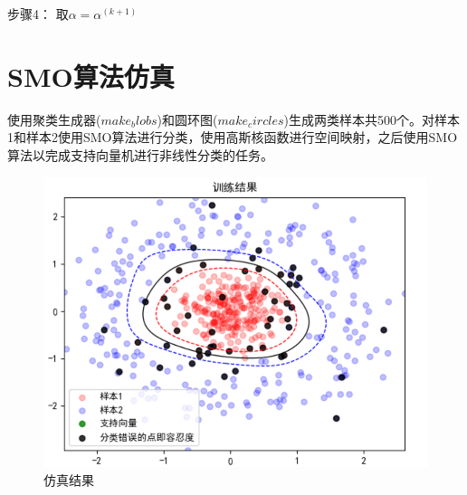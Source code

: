\documentclass[12pt,a4paper]{article}%
\begin{document}
	步骤4：
	取$\alpha={\alpha}^{(k+1)}$
	
	\section{SMO算法仿真}
	
	使用聚类生成器($make_blobs$)和圆环图($make_circles$)生成两类样本共500个。对样本1和样本2使用SMO算法进行分类，使用高斯核函数进行空间映射，之后使用SMO算法以完成支持向量机进行非线性分类的任务。
	\begin{figure}[H]%
		\centering
		\begin{minipage}{0.6\textwidth}%
			\centering
			\includegraphics[width=0.8%
			\textwidth]{figure10}%
			\caption{\fontsize{10pt}{15pt}\selectfont 仿真结果}%
		\end{minipage}
	\end{figure}
\end{document}
